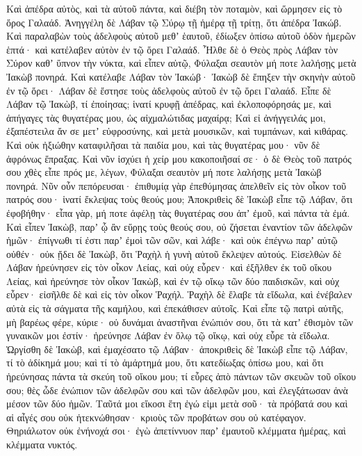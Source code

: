{Καὶ ἀπέδρα αὐτὸς, καὶ τὰ αὐτοῦ πάντα, καὶ διέβη τὸν ποταμὸν, καὶ ὥρμησεν εἰς τὸ ὄρος Γαλαάδ.
Ἀνηγγέλη δὲ Λάβαν τῷ Σύρῳ τῇ ἡμέρᾳ τῇ τρίτῃ, ὅτι ἀπέδρα Ἰακώβ.
Καὶ παραλαβὼν τοὺς ἀδελφοὺς αὐτοῦ μεθʼ ἑαυτοῦ, ἐδίωξεν ὀπίσω αὐτοῦ ὁδὸν ἡμερῶν ἑπτά· καὶ κατέλαβεν αὐτὸν ἐν τῷ ὄρει Γαλαάδ.
Ἦλθε δὲ ὁ Θεὸς πρὸς Λάβαν τὸν Σύρον καθʼ ὕπνον τὴν νύκτα, καὶ εἶπεν αὐτῷ, Φύλαξαι σεαυτὸν μή ποτε λαλήσῃς μετὰ Ἰακὼβ πονηρά.
Καὶ κατέλαβε Λάβαν τὸν Ἰακώβ· Ἰακὼβ δὲ ἔπηξεν τὴν σκηνὴν αὐτοῦ ἐν τῷ ὄρει· Λάβαν δὲ ἔστησε τοὺς ἀδελφοὺς αὐτοῦ ἐν τῷ ὄρει Γαλαάδ.
Εἶπε δὲ Λάβαν τῷ Ἰακὼβ, τί ἐποίησας; ἱνατί κρυφῇ ἀπέδρας, καὶ ἐκλοποφόρησάς με, καὶ ἀπήγαγες τὰς θυγατέρας μου, ὡς αἰχμαλώτιδας μαχαίρᾳ;
Καὶ εἰ ἀνήγγειλάς μοι, ἐξαπέστειλα ἄν σε μετʼ εὐφροσύνης, καὶ μετὰ μουσικῶν, καὶ τυμπάνων, καὶ κιθάρας.
Καὶ οὐκ ἠξιώθην καταφιλῆσαι τὰ παιδία μου, καὶ τὰς θυγατέρας μου· νῦν δὲ ἀφρόνως ἔπραξας.
Καὶ νῦν ἰσχύει ἡ χείρ μου κακοποιῆσαί σε· ὁ δὲ Θεὸς τοῦ πατρός σου χθὲς εἶπε πρός με, λέγων, Φύλαξαι σεαυτὸν μή ποτε λαλήσῃς μετὰ Ἰακὼβ πονηρά.
Νῦν οὖν πεπόρευσαι· ἐπιθυμίᾳ γὰρ ἐπεθύμησας ἀπελθεῖν εἰς τὸν οἶκον τοῦ πατρός σου· ἱνατί ἔκλεψας τοὺς θεούς μου;
Ἀποκριθεὶς δὲ Ἰακὼβ εἶπε τῷ Λάβαν, ὅτι ἐφοβήθην· εἶπα γὰρ, μή ποτε ἀφέλῃ τὰς θυγατέρας σου ἀπʼ ἐμοῦ, καὶ πάντα τὰ ἐμά.
Καὶ εἶπεν Ἰακὼβ, παρʼ ᾧ ἂν εὕρῃς τοὺς θεούς σου, οὐ ζήσεται ἐναντίον τῶν ἀδελφῶν ἡμῶν· ἐπίγνωθι τί ἐστι παρʼ ἐμοὶ τῶν σῶν, καὶ λάβε· καὶ οὐκ ἐπέγνω παρʼ αὐτῷ οὐθέν· οὐκ ᾔδει δὲ Ἰακὼβ, ὅτι Ῥαχὴλ ἡ γυνὴ αὐτοῦ ἔκλεψεν αὐτούς.
Εἰσελθὼν δὲ Λάβαν ἠρεύνησεν εἰς τὸν οἶκον Λείας, καὶ οὐχ εὗρεν· καὶ ἐξῆλθεν ἐκ τοῦ οἴκου Λείας, καὶ ἠρεύνησε τὸν οἶκον Ἰακὼβ, καὶ ἐν τῷ οἴκῳ τῶν δύο παιδισκῶν, καὶ οὐχ εὗρεν· εἰσῆλθε δὲ καὶ εἰς τὸν οἶκον Ῥαχήλ.
Ῥαχὴλ δὲ ἔλαβε τὰ εἴδωλα, καὶ ἐνέβαλεν αὐτὰ εἰς τὰ σάγματα τῆς καμήλου, καὶ ἐπεκάθισεν αὐτοῖς.
Καὶ εἶπε τῷ πατρὶ αὐτῆς, μὴ βαρέως φέρε, κύριε· οὐ δυνάμαι ἀναστῆναι ἐνώπιόν σου, ὅτι τὰ κατʼ ἐθισμὸν τῶν γυναικῶν μοι ἐστίν· ἠρεύνησε Λάβαν ἐν ὅλῳ τῷ οἴκῳ, καὶ οὐχ εὗρε τὰ εἴδωλα.
Ὠργίσθη δὲ Ἰακὼβ, καὶ ἐμαχέσατο τῷ Λάβαν· ἀποκριθεὶς δὲ Ἰακὼβ εἶπε τῷ Λάβαν, τί τὸ ἀδίκημά μου; καὶ τί τὸ ἁμάρτημά μου, ὅτι κατεδίωξας ὀπίσω μου,
καὶ ὅτι ἠρεύνησας πάντα τὰ σκεύη τοῦ οἴκου μου; τί εὗρες ἀπὸ πάντων τῶν σκευῶν τοῦ οἴκου σου; θὲς ὧδε ἐνώπιον τῶν ἀδελφῶν σου καὶ τῶν ἀδελφῶν μου, καὶ ἐλεγξάτωσαν ἀνὰ μέσον τῶν δύο ἡμῶν.
Ταῦτά μοι εἴκοσι ἔτη ἐγώ εἰμι μετὰ σοῦ· τὰ πρόβατά σου καὶ αἱ αἶγές σου οὐκ ἠτεκνώθησαν· κριοὺς τῶν προβάτων σου οὐ κατέφαγον.
Θηριάλωτον οὐκ ἐνήνοχά σοι· ἐγὼ ἀπετίννυον παρʼ ἐμαυτοῦ κλέμματα ἡμέρας, καὶ κλέμματα νυκτός.
}
